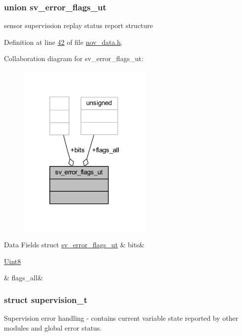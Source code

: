 \subsubsection{union sv\+\_\+error\+\_\+flags\+\_\+ut}
sensor supervission replay status report structure 

Definition at line \hyperlink{a00022_source_l00042}{42} of file \hyperlink{a00022_source}{nov\+\_\+data.\+h}.



Collaboration diagram for sv\+\_\+error\+\_\+flags\+\_\+ut\+:\nopagebreak
\begin{figure}[H]
\begin{center}
\leavevmode
\includegraphics[width=187pt]{db/dbf/a00975}
\end{center}
\end{figure}
\begin{DoxyFields}{Data Fields}
\hypertarget{a00022_ab81eb6fb4f1351ed07b4d6c4dd6f1959}{struct \hyperlink{a00022_d4/dd7/a00793}{sv\+\_\+error\+\_\+flags\+\_\+ut}}\label{a00022_ab81eb6fb4f1351ed07b4d6c4dd6f1959}
&
bits&
\\
\hline

\hypertarget{a00022_a1caa87b00c878186140c3bac9c8acf3b}{\hyperlink{a00072_af84840501dec18061d18a68c162a8fa2}{Uint8}}\label{a00022_a1caa87b00c878186140c3bac9c8acf3b}
&
flags\+\_\+all&
\\
\hline

\end{DoxyFields}
\label{d3/daf/a00790}
\hypertarget{a00022_d3/daf/a00790}{}
\subsubsection{struct supervision\+\_\+t}
Supervision error handling -\/ contains current variable state reported by other modules and global error status. 

